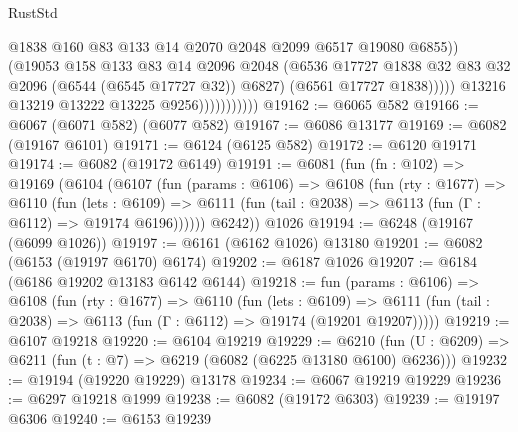 \begin{lexlean}{RustStd}
\begin{coremodule}
                                    @1838
                                    @160
                                    @83
                                    @133
                                    @14
                                    @2070
                                    @2048
                                    @2099
                                    @6517
                                    @19080
                                    @6855))
                                (@19053
                                  @158
                                  @133
                                  @83
                                  @14
                                  @2096
                                  @2048
                                  (@6536
                                    @17727
                                    @1838
                                    @32
                                    @83
                                    @32
                                    @2096
                                    (@6544 (@6545 @17727 @32))
                                    @6827)
                                  (@6561 @17727 @1838)))))
                          @13216
                          @13219
                          @13222
                          @13225
                          @9256)))))))))))
@19162 := @6065 @582
@19166 := @6067 (@6071 @582) (@6077 @582)
@19167 := @6086 @13177
@19169 := @6082 (@19167 @6101)
@19171 := @6124 (@6125 @582)
@19172 := @6120 @19171
@19174 := @6082 (@19172 @6149)
@19191 := @6081
    (fun (fn : @102) =>
    @19169
      (@6104
        (@6107
          (fun (params : @6106) =>
          @6108
            (fun (rty : @1677) =>
            @6110
              (fun (lets : @6109) =>
              @6111 (fun (tail : @2038) => @6113 (fun (Γ : @6112) => @19174 @6196))))))
        @6242))
    @1026
@19194 := @6248 (@19167 (@6099 @1026))
@19197 := @6161 (@6162 @1026) @13180
@19201 := @6082 (@6153 (@19197 @6170) @6174)
@19202 := @6187 @1026
@19207 := @6184 (@6186 @19202 @13183 @6142 @6144)
@19218 := fun (params : @6106) =>
  @6108
    (fun (rty : @1677) =>
    @6110
      (fun (lets : @6109) =>
      @6111 (fun (tail : @2038) => @6113 (fun (Γ : @6112) => @19174 (@19201 @19207)))))
@19219 := @6107 @19218
@19220 := @6104 @19219
@19229 := @6210
    (fun (U : @6209) => @6211 (fun (t : @7) => @6219 (@6082 (@6225 @13180 @6100) @6236)))
@19232 := @19194 (@19220 @19229) @13178
@19234 := @6067 @19219 @19229
@19236 := @6297 @19218 @1999
@19238 := @6082 (@19172 @6303)
@19239 := @19197 @6306
@19240 := @6153 @19239

\end{coremodule}
\end{lexlean}
